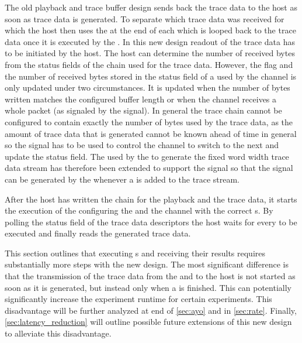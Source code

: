 The old playback and trace buffer design sends back the trace data to the host as soon as trace data is generated. To separate which trace data was received for which \PlaybackProgram{} the host then uses the \haltInstr{} at the end of each \PlaybackProgram{} which is looped back to the trace data once it is executed by the \pbexec{}.
In this new design readout of the trace data has to be initiated by the host. The host can determine the number of received bytes from the status fields of the \descriptor{} chain used for the trace data.
However, the \completed{} flag and the number of received bytes stored in the status field of a \descriptor{} used by the \SToMM{} channel is only updated under two circumstances. It is updated when the number of bytes written matches the configured buffer length or when the \SToMM{} channel receives a whole packet (as signaled by the \TLAST{} signal). In general the trace \descriptor{} chain cannot be configured to contain exactly the number of bytes used by the trace data, as the amount of trace data that is generated cannot be known ahead of time in general so the \TLAST{} signal has to be used to control the \SToMM{} channel to switch to the next \descriptor{} and update the status field.
The \UTEncoder{} used by the \pbexec{} to generate the fixed word width trace data stream has therefore been extended to support the \TLAST{} signal so that the \TLAST{} signal can be generated by the \pbexec{} whenever a \haltInstr{} is added to the trace stream.

After the host has written the \descriptor{} chain for the playback and the trace data, it starts the execution of the \PlaybackProgram{} configuring the \SToMM{} and the \MMToS{} channel with the correct \descriptor{}s.
By polling the status field of the trace data descriptors the host waits for every \PlaybackProgram{} to be executed and finally reads the generated trace data.

This section outlines that executing \PlaybackProgram{}s and receiving their results requires substantially more steps with the new design. The most significant difference is that the transmission of the trace data from the \FPGA{} and to the host is not started as soon as it is generated, but instead only when a \PlaybackProgram{} is finished. This can potentially significantly increase the experiment runtime for certain experiments. This disadvantage will be further analyzed at end of \autoref{sec:ayo} and in \autoref{sec:rate}. Finally, \autoref{sec:latency_reduction} will outline possible future extensions of this new design to alleviate this disadvantage.
